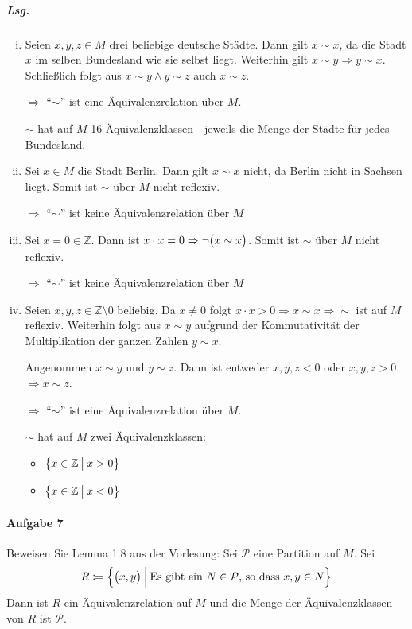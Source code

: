 \documentclass{scrreprt}
\begin{document}
\subparagraph{Lsg.}
\begin{enumerate}[(i)]
\item Seien $x, y, z \in M$ drei beliebige deutsche Städte.
  Dann gilt $x \sim x$, da die Stadt $x$ im selben Bundesland wie sie selbst
  liegt.
  Weiterhin gilt $x \sim y \Rightarrow y \sim x$.
  Schließlich folgt aus $x \sim y \land y \sim z$ auch $x \sim z$.

  $\Rightarrow$ ``$\sim$'' ist eine Äquivalenzrelation über $M$.

  $\sim$ hat auf $M$ 16 Äquivalenzklassen - jeweils die Menge der Städte für
  jedes Bundesland.

\item Sei $x \in M$ die Stadt Berlin.
  Dann gilt $x \sim x$ nicht, da Berlin nicht in Sachsen liegt.
  Somit ist $\sim$ über $M$ nicht reflexiv.

  $\Rightarrow$ ``$\sim$'' ist keine Äquivalenzrelation über $M$

\item Sei $x = 0 \in \mathbb{Z}$.
  Dann ist $x \cdot x = 0 \Rightarrow \neg \qty\big(x \sim x)$.
  Somit ist $\sim$ über $M$ nicht reflexiv.

  $\Rightarrow$ ``$\sim$'' ist keine Äquivalenzrelation über $M$

\item Seien $x, y, z \in \mathbb{Z} \setminus \qty{0}$ beliebig.
  Da $x \ne 0$ folgt $x \cdot x > 0 \Rightarrow x \sim x \Rightarrow \sim$
  ist auf $M$ reflexiv.
  Weiterhin folgt aus $x \sim y$ aufgrund der Kommutativität der Multiplikation
  der ganzen Zahlen $y \sim x$.

  Angenommen $x \sim y$ und $y \sim z$.
  Dann ist entweder $x, y, z < 0$ oder $x, y, z > 0$.
  $\Rightarrow x \sim z$.

  $\Rightarrow$ ``$\sim$'' ist eine Äquivalenzrelation über $M$.

  $\sim$ hat auf $M$ zwei Äquivalenzklassen:
  \begin{itemize}
  \item $\qty\big{x \in \mathbb{Z} \: {\big |} \: x > 0}$
  \item $\qty\big{x \in \mathbb{Z} \: {\big |} \: x < 0}$
  \end{itemize}
\end{enumerate}

\newpage
\paragraph{Aufgabe 7} Beweisen Sie Lemma 1.8 aus der Vorlesung:
Sei $\mathcal{P}$ eine Partition auf $M$.
Sei
\[
  R \coloneqq \qty\Big{\qty\big(x, y) \: {\Big |} \:
    \text{Es gibt ein } N \in \mathcal{P} \text{, so dass } x, y \in N}
\]
Dann ist $R$ ein Äquivalenzrelation auf $M$ und die Menge der Äquivalenzklassen
von $R$ ist $\mathcal{P}$.
\end{document}
